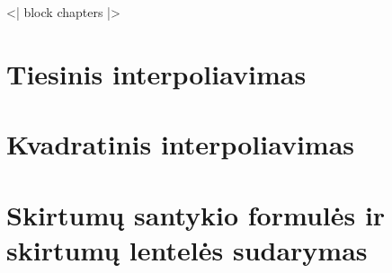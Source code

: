 <| block chapters |>
\newcommand{\cinput}[1]{}

\cinput{01.tex}   %
\cinput{02.tex}   %
\cinput{03.tex}   %

\section{Tiesinis interpoliavimas}
\cite[158-163]{textbook}
\section{Kvadratinis interpoliavimas}
\cite[165-167]{textbook}
\section{Skirtumų santykio formulės ir skirtumų lentelės sudarymas}
\cite[163]{textbook}
